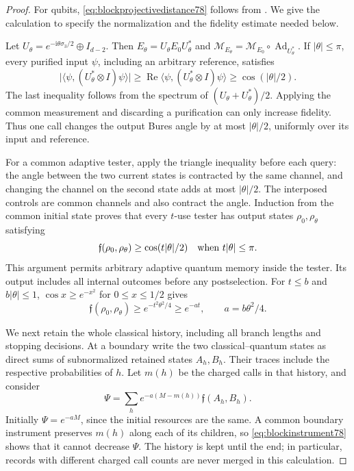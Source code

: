 \begin{proof}
For qubits, \eqref{eq:blockprojectivedistance78} follows from
\cite[Corollary~1 and Theorem~2]{PPKKO72}.  We give the calculation
to specify the normalization and the fidelity estimate needed below.

Let $U_\theta=e^{-\mathrm i\theta\sigma_3/2}\oplus I_{d-2}$.
Then $E_\theta=U_\theta E_0U_\theta^*$ and
$\mathcal M_{E_\theta}=\mathcal M_{E_0}\circ
\operatorname{Ad}_{U_\theta^*}$.  If $|\theta|\le\pi$, every
purified input $\psi$, including an arbitrary reference, satisfies
\[
 \big|\langle\psi,(U_\theta^*\otimes I)\psi\rangle\big|
 \ge \operatorname{Re}\langle\psi,
                    (U_\theta^*\otimes I)\psi\rangle
 \ge\cos(|\theta|/2).
\]
The last inequality follows from the spectrum of
$(U_\theta+U_\theta^*)/2$.  Applying the common measurement and
discarding a purification can only increase fidelity.  Thus one
call changes the output Bures angle by at most $|\theta|/2$,
uniformly over its input and reference.

For a common adaptive tester, apply the triangle inequality before
each query: the angle between the two current states is contracted
by the same channel, and changing the channel on the second state
adds at most $|\theta|/2$.  The interposed controls are common
channels and also contract the angle.  Induction from the common
initial state proves that every $t$-use tester has output states
$\rho_0,\rho_\theta$ satisfying
\begin{equation}\label{eq:blocklocalfidelity78}
 \mathfrak f(\rho_0,\rho_\theta)
 \ge\cos(t|\theta|/2)
 \quad\hbox{when }t|\theta|\le\pi.
\end{equation}
This argument permits arbitrary adaptive quantum memory inside the
tester.  Its output includes all internal outcomes before any
postselection.  For $t\le b$ and $b|\theta|\le1$,
$\cos x\ge e^{-x^2}$ for $0\le x\le1/2$ gives
\begin{equation}\label{eq:blocklocalexponential78}
 \mathfrak f(\rho_0,\rho_\theta)
 \ge e^{-t^2\theta^2/4}\ge e^{-at},
 \qquad a=b\theta^2/4.
\end{equation}

We next retain the whole classical history, including all branch
lengths and stopping decisions.  At a boundary write the two
classical--quantum states as direct sums of subnormalized retained
states $A_h,B_h$.  Their traces include the respective probabilities
of $h$.  Let $m(h)$ be the charged calls in that history, and consider
\begin{equation}\label{eq:blockpotential78}
 \Psi=\sum_h e^{-a(M-m(h))}\mathfrak f(A_h,B_h).
\end{equation}
Initially $\Psi=e^{-aM}$, since the initial resources are the same.
A common boundary instrument preserves $m(h)$ along each of its
children, so \eqref{eq:blockinstrument78} shows that it cannot
decrease $\Psi$.  The history is kept until the end; in particular,
records with different charged call counts are never merged in this
calculation.


\end{proof}
